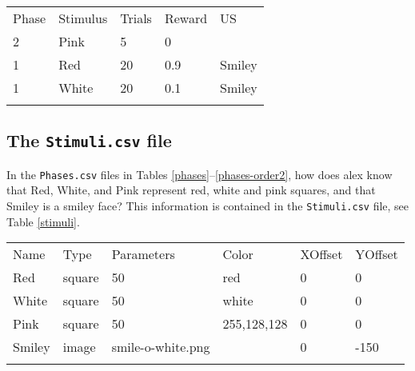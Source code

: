 \documentclass[11pt,]{article}
\renewcommand{\medskip}{}
\begin{document}
\begin{table*}[t]\begin{center}\small\begin{tabular}{@{}lllll@{}}
\hline\noalign{\medskip}
Phase & Stimulus & Trials & Reward & US
\\\noalign{\medskip}
\hline\noalign{\medskip}
2 & Pink & 5 & 0 &
\\\noalign{\medskip}
1 & Red & 20 & 0.9 & Smiley
\\\noalign{\medskip}
1 & White & 20 & 0.1 & Smiley
\\\noalign{\medskip}
\hline
\noalign{\medskip}
\end{tabular}\caption{With this \texttt{Phases.csv} file, alex will run phase 2
before phase 1 (cf.~Table \ref{phases-order1}. \label{phases-order2}}
\end{center}\end{table*}

\subsection{The \texttt{Stimuli.csv} file}

In the \texttt{Phases.csv} files in Tables
\ref{phases}--\ref{phases-order2}, how does alex know that Red, White,
and Pink represent red, white and pink squares, and that Smiley is a
smiley face? This information is contained in the \texttt{Stimuli.csv}
file, see Table \ref{stimuli}.

\begin{table*}[t]\begin{center}\small\begin{tabular}{@{}llllll@{}}
\hline\noalign{\medskip}
Name & Type & Parameters & Color & XOffset & YOffset
\\\noalign{\medskip}
\hline\noalign{\medskip}
Red & square & 50 & red & 0 & 0
\\\noalign{\medskip}
White & square & 50 & white & 0 & 0
\\\noalign{\medskip}
Pink & square & 50 & 255,128,128 & 0 & 0
\\\noalign{\medskip}
Smiley & image & smile-o-white.png & & 0 & -150
\\\noalign{\medskip}
\hline
\noalign{\medskip}
\end{tabular}\caption{A \texttt{Stimuli.csv} file instructing alex that stimuli Red,
White, and Pink are colored squares 50 pixels in side, and with
different colors, and that Smiley is an image contained in file
\texttt{smile-o-white.png}. \label{stimuli}}
\end{center}\end{table*}
\end{document}
